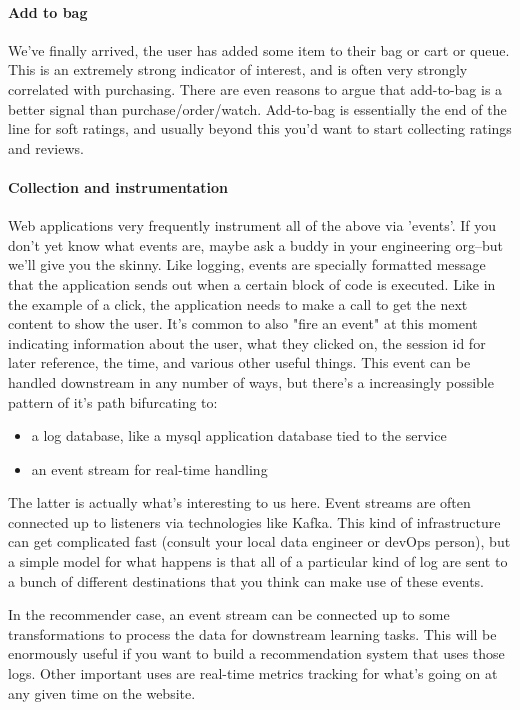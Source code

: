 \paragraph{Add to bag}

We've finally arrived, the user has added some item to their bag or cart or queue. This is an extremely strong indicator of interest, and is often very strongly correlated with purchasing. There are even reasons to argue that add-to-bag is a better signal than purchase/order/watch. Add-to-bag is essentially the end of the line for soft ratings, and usually beyond this you'd want to start collecting ratings and reviews.


\paragraph{Collection and instrumentation}

Web applications very frequently instrument all of the above via 'events'. If you don't yet know what events are, maybe ask a buddy in your engineering org–but we'll give you the skinny. Like logging, events are specially formatted message that the application sends out when a certain block of code is executed. Like in the example of a click, the application needs to make a call to get the next content to show the user. It's common to also "fire an event" at this moment indicating information about the user, what they clicked on, the session id for later reference, the time, and various other useful things. This event can be handled downstream in any number of ways, but there's a increasingly possible pattern of it's path bifurcating to:

\begin{itemize}
\item a log database, like a mysql application database tied to the service
\item an event stream for real-time handling
\end{itemize}

The latter is actually what's interesting to us here. Event streams are often connected up to listeners via technologies like Kafka. This kind of infrastructure can get complicated fast (consult your local data engineer or devOps person), but a simple model for what happens is that all of a particular kind of log are sent to a bunch of different destinations that you think can make use of these events.

In the recommender case, an event stream can be connected up to some transformations to process the data for downstream learning tasks. This will be enormously useful if you want to build a recommendation system that uses those logs. Other important uses are real-time metrics tracking for what's going on at any given time on the website.

